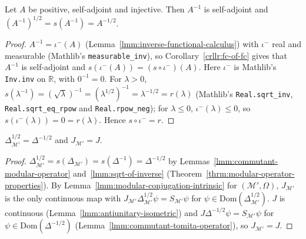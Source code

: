\begin{lemma}
    \label{lmm:sqrt-of-inverse}
    \leanok
    Let $A$ be positive, self-adjoint and injective. Then $A^{-1}$ is self-adjoint and $(A^{-1})^{1/2} = s(A^{-1}) = A^{-1/2}$.
\end{lemma}
\begin{proof}
    \leanok
    $A^{-1} = \iota^-(A)$ (Lemma~\ref{lmm:inverse-functional-calculus}) with $\iota^-$ real and measurable (Mathlib's \texttt{measurable\_inv}), so Corollary~\ref{crllr:fc-of-fc} gives that $A^{-1}$ is self-adjoint and $s(\iota^-(A)) = (s \circ \iota^-)(A)$. Here $\iota^-$ is Mathlib's \texttt{Inv.inv} on $\mathbb{R}$, with $0^{-1} = 0$. For $\lambda > 0$, $s(\lambda^{-1}) = (\sqrt{\lambda})^{-1} = (\lambda^{1/2})^{-1} = \lambda^{-1/2} = r(\lambda)$ (Mathlib's \texttt{Real.sqrt\_inv}, \texttt{Real.sqrt\_eq\_rpow} and \texttt{Real.rpow\_neg}); for $\lambda \le 0$, $\iota^-(\lambda) \le 0$, so $s(\iota^-(\lambda)) = 0 = r(\lambda)$. Hence $s \circ \iota^- = r$.
\end{proof}

\begin{lemma}[$J_{\mathcal{M}'} = J$]
    \label{lmm:commutant-modular-conjugation}
    \leanok
    $\Delta_{\mathcal{M}'}^{1/2} = \Delta^{-1/2}$ and $J_{\mathcal{M}'} = J$.
\end{lemma}
\begin{proof}
    \leanok
    $\Delta_{\mathcal{M}'}^{1/2} = s(\Delta_{\mathcal{M}'}) = s(\Delta^{-1}) = \Delta^{-1/2}$ by Lemmas~\ref{lmm:commutant-modular-operator} and~\ref{lmm:sqrt-of-inverse} (Theorem~\ref{thrm:modular-operator-properties}). By Lemma~\ref{lmm:modular-conjugation-intrinsic} for $(\mathcal{M}', \Omega)$, $J_{\mathcal{M}'}$ is the only continuous map with $J_{\mathcal{M}'}\Delta_{\mathcal{M}'}^{1/2}\psi = S_{\mathcal{M}'}\psi$ for $\psi \in \text{Dom}(\Delta_{\mathcal{M}'}^{1/2})$. $J$ is continuous (Lemma~\ref{lmm:antiunitary-isometric}) and $J\Delta^{-1/2}\psi = S_{\mathcal{M}'}\psi$ for $\psi \in \text{Dom}(\Delta^{-1/2})$ (Lemma~\ref{lmm:commutant-tomita-operator}), so $J_{\mathcal{M}'} = J$.
\end{proof}

